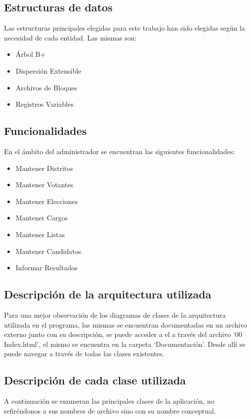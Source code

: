 \documentclass[a4paper,10pt]{article}
\begin{document}
\subsection{Estructuras de datos}
	Las estructuras principales elegidas para este trabajo han sido elegidas según la necesidad de cada entidad. Las mismas son:

\begin{itemize}
\item Árbol B+
\item Dispersión Extensible
\item Archivos de Bloques
\item Registros Variables
\end{itemize}	
	
\subsection{Funcionalidades}
En el ámbito del administrador se encuentran las siguientes funcionalidades:

\begin{itemize}
\item Mantener Distritos
\item Mantener Votantes
\item Mantener Elecciones
\item Mantener Cargos
\item Mantener Listas
\item Mantener Candidatos
\item Informar Resultados
\end{itemize}	

\subsection{Descripción de la arquitectura utilizada}

Para una mejor observación de los diagramas de clases de la arquitectura utilizada en el programa, las mismas se encuentran documentadas en un archivo externo junto con su descripción, se puede acceder a el a través del archivo `00 Index.html', el mismo se encuentra en la carpeta `Documentación'. Desde allí se puede navegar a través de todas las clases existentes.


\subsection{Descripción de cada clase utilizada}

    A continuación se enumeran las principales clases de la aplicación, no refiréndonos a sus nombres de archivo sino con su nombre conceptual.
\end{document}
